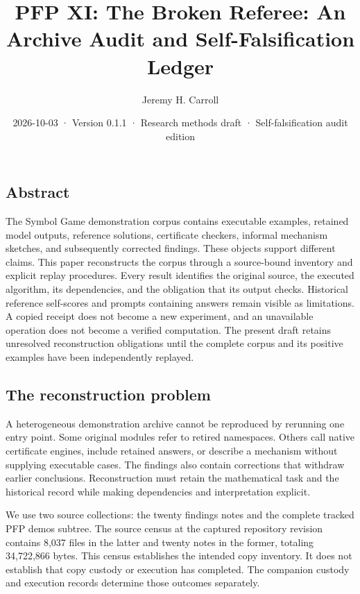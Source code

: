 \documentclass[
  11pt,
]{article}
\title{PFP XI: The Broken Referee: An Archive Audit and Self-Falsification Ledger}
\author{Jeremy H. Carroll}
\date{2026-10-03 · Version 0.1.1 · Research methods draft · Self-falsification audit edition}
\begin{document}
\makeatletter
\begin{center}
{\LARGE \@title\par}
\vspace{0.8em}
{\normalsize \@author\par}
\vspace{0.5em}
{\small \@date\par}
\end{center}
\makeatother
\subsection{Abstract}\label{abstract}

The Symbol Game demonstration corpus contains executable examples,
retained model outputs, reference solutions, certificate checkers,
informal mechanism sketches, and subsequently corrected findings. These
objects support different claims. This paper reconstructs the corpus
through a source-bound inventory and explicit replay procedures. Every
result identifies the original source, the executed algorithm, its
dependencies, and the obligation that its output checks. Historical
reference self-scores and prompts containing answers remain visible as
limitations. A copied receipt does not become a new experiment, and an
unavailable operation does not become a verified computation. The
present draft retains unresolved reconstruction obligations until the
complete corpus and its positive examples have been independently
replayed.

\subsection{The reconstruction
problem}\label{the-reconstruction-problem}

A heterogeneous demonstration archive cannot be reproduced by rerunning
one entry point. Some original modules refer to retired namespaces.
Others call native certificate engines, include retained answers, or
describe a mechanism without supplying executable cases. The findings
also contain corrections that withdraw earlier conclusions.
Reconstruction must retain the mathematical task and the historical
record while making dependencies and interpretation explicit.

We use two source collections: the twenty findings notes and the
complete tracked PFP demos subtree. The source census at the captured
repository revision contains 8,037 files in the latter and twenty notes
in the former, totaling 34,722,866 bytes. This census establishes the
intended copy inventory. It does not establish that copy custody or
execution has completed. The companion custody and execution records
determine those outcomes separately.
\end{document}
